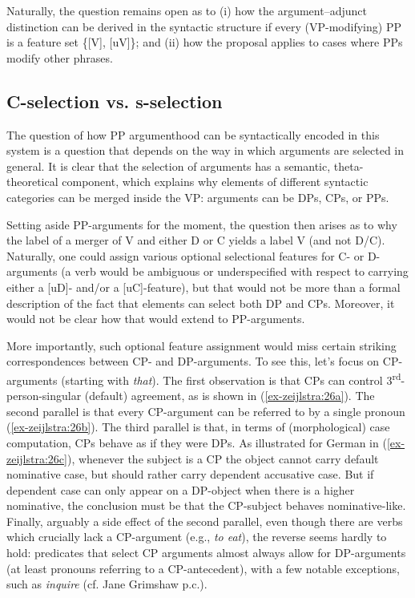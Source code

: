 \documentclass[output=paper
,modfonts
,nonflat]{langsci/langscibook}
\begin{document}
Naturally, the question remains open as to (i) how the argument–adjunct distinction can be derived in the syntactic structure if every (VP-modifying) PP is a feature set \{[V], [uV]\}; and (ii) how the proposal applies to cases where PPs modify other phrases.

\subsection{C-selection vs. s-selection}
The question of how PP argumenthood can be syntactically encoded in this system is a question that depends on the way in which arguments are selected in general. It is clear that the selection of arguments has a semantic, theta-theoretical component, which explains why elements of different syntactic categories can be merged inside the VP: arguments can be DPs, CPs, or PPs.

Setting aside PP-arguments for the moment, the question then arises as to why the label of a merger of V and either D or C yields a label V (and not D\slash C). Naturally, one could assign various optional selectional features for C- or D-ar\-gu\-ments (a verb would be ambiguous or underspecified with respect to carrying either a [uD]- and/or a [uC]-feature), but that would not be more than a formal description of the fact that elements can select both DP and CPs. Moreover, it would not be clear how that would extend to PP-arguments.

More importantly, such optional feature assignment would miss certain striking correspondences between CP- and DP-arguments. To see this, let’s focus on CP-arguments (starting with \textit{that}). The first observation is that CPs can control 3\textsuperscript{rd}-person-singular (default) agreement, as is shown in (\ref{ex-zeijlstra:26a}). The second parallel is that every CP-argument can be referred to by a single pronoun (\ref{ex-zeijlstra:26b}). The third parallel is that, in terms of (morphological) case computation, CPs behave as if they were DPs. As illustrated for German in (\ref{ex-zeijlstra:26c}), whenever the subject is a CP the object cannot carry default nominative case, but should rather carry dependent accusative case. But if dependent case can only appear on a DP-object when there is a higher nominative, the conclusion must be that the CP-subject behaves nominative-like. Finally, arguably a side effect of the second parallel, even though there are verbs which crucially lack a CP-argument (e.g., \textit{to eat}), the reverse seems hardly to hold: predicates that select CP arguments almost always allow for DP-arguments (at least pronouns referring to a CP-antecedent), with a few notable exceptions, such as \textit{inquire} (cf. Jane Grimshaw p.c.).\largerpage[-1]
\end{document}
